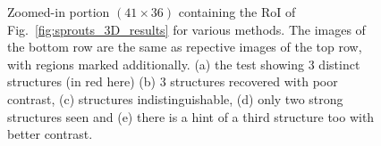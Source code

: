 \documentclass[journal]{IEEEtran}
\begin{document}
\begin{figure}[!h]
          \hfill
            \hfill
              \hfill
                \hfill
{}
\caption{Zoomed-in portion $(41 \times 36)$ containing the RoI of Fig.~\ref{fig:sprouts_3D_results} for various methods. The images of the bottom row are the same as repective images of the top row, with regions marked additionally. (a) the test showing 3 distinct structures (in red here) (b) 3 structures recovered with poor contrast, (c) structures indistinguishable, (d) only two strong structures seen and (e) there is a hint of a third structure too with better contrast.}
\label{fig:sprouts_zoomed_3D_results}
\end{figure}
\end{document}
